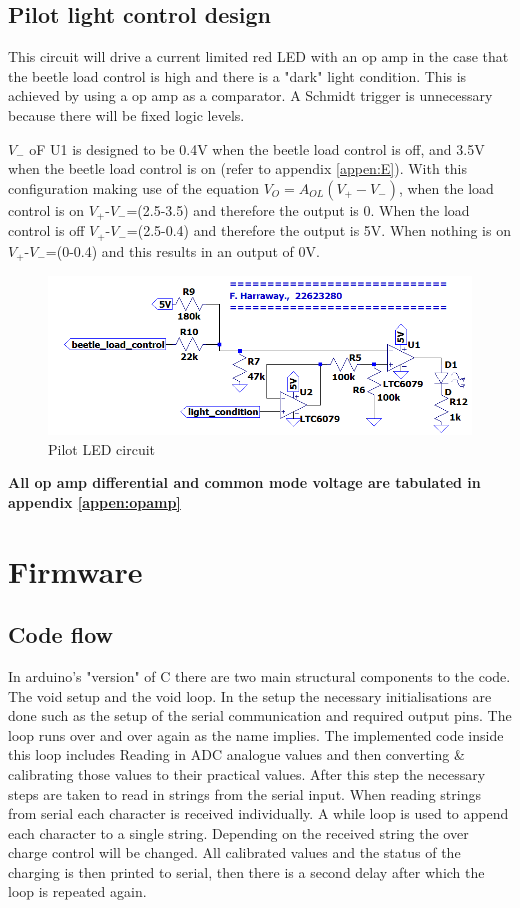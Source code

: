 \subsection{Pilot light control design}

This circuit will drive a current limited red LED with an op amp in the case that the beetle load control is high and there is a "dark" light condition. This is achieved by using a op amp as a comparator. A Schmidt trigger is unnecessary because there will be fixed logic levels. 

 $V_-$  oF U1 is designed to be 0.4V when the beetle load control is off, and 3.5V when the beetle load control is on (refer to appendix \ref{appen:E}). With this configuration making use of the equation $V_O=A_{OL}(V_+-V_-)$, when the load control is on $V_+$-$V_-$=(2.5-3.5) and therefore the output is 0. When the load control is off  $V_+$-$V_-$=(2.5-0.4) and therefore the output is 5V. When nothing is on  $V_+$-$V_-$=(0-0.4) and this results in an output of 0V.
\begin{figure}[!htb]
	\centering
	\includegraphics[width=0.55\linewidth]{Figures/A7/pilotLED.png}
	\caption{Pilot LED circuit}
	\label{fig:pilot}
\end{figure}


\textbf{All op amp differential and common mode voltage are tabulated in appendix \ref{appen:opamp}}


\section{Firmware}
\subsection{Code flow}
In arduino's "version" of C there are two main structural components to the code. The void setup and the void loop. In the setup the necessary initialisations are done such as the setup of the serial communication and required output pins. The loop runs over and over again as the name implies. The implemented code inside this loop includes Reading in ADC analogue values and then converting \& calibrating those values to their practical values. After this step the necessary steps are taken to read in strings from the serial input. When reading strings from serial each character is received individually. A while loop is used to append each character to a single string. Depending on the received string the over charge control will be changed. All calibrated values and the status of the charging is then printed to serial, then there is a second delay after which the loop is repeated again.

